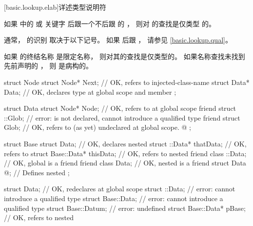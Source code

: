 %

[basic.lookup.elab]{详述类型说明符}%
%

\pnum
如果  中的  或  关键字
后跟一个不后跟 \tcode{::} 的 ，
则对  的查找是仅类型 的。
\begin{note}
通常， 的识别
取决于以下记号。
如果  后跟 \tcode{::}，
请参见 \ref{basic.lookup.qual}。
\end{note}

\pnum
如果  的终结名称
是限定名称，
则对其的查找是仅类型的。
如果名称查找未找到先前声明的 ，
则  是病构的。

\pnum
\begin{example}
\begin{codeblock}
struct Node {
  struct Node* Next;            // OK, refers to injected-class-name 
  struct Data* Data;            // OK, declares type  at global scope and member 
};

struct Data {
  struct Node* Node;            // OK, refers to  at global scope
  friend struct ::Glob;         // error:  is not declared, cannot introduce a qualified type
  friend struct Glob;           // OK, refers to (as yet) undeclared  at global scope.
  @\commentellip@
};

struct Base {
  struct Data;                  // OK, declares nested 
  struct ::Data*     thatData;  // OK, refers to 
  struct Base::Data* thisData;  // OK, refers to nested 
  friend class ::Data;          // OK, global  is a friend
  friend class Data;            // OK, nested  is a friend
  struct Data { @\commentellip@ };    // Defines nested 
};

struct Data;                    // OK, redeclares  at global scope
struct ::Data;                  // error: cannot introduce a qualified type
struct Base::Data;              // error: cannot introduce a qualified type
struct Base::Datum;             // error:  undefined
struct Base::Data* pBase;       // OK, refers to nested 
\end{codeblock}
\end{example}
%

